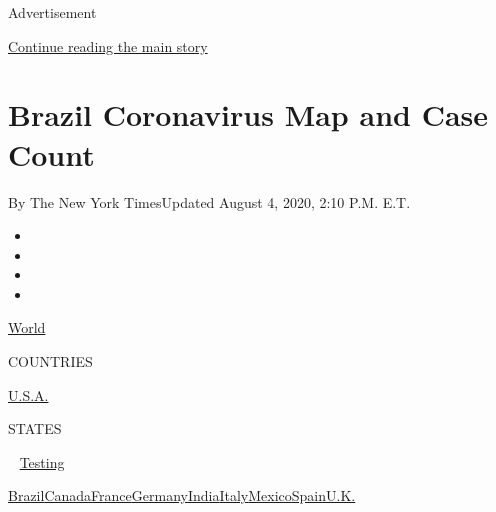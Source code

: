 Advertisement

\protect\hyperlink{after-top}{Continue reading the main story}

\hypertarget{brazil-coronavirus-map-and-case-count}{%
\section{Brazil Coronavirus Map and Case
Count}\label{brazil-coronavirus-map-and-case-count}}

By The New York TimesUpdated August 4, 2020, 2:10 P.M. E.T.

\begin{itemize}
\item
\item
\item
\item
\end{itemize}

\href{https://www.nytimes3xbfgragh.onion/interactive/2020/world/coronavirus-maps.html}{World}~

COUNTRIES

\textbar{}
\href{https://www.nytimes3xbfgragh.onion/interactive/2020/us/coronavirus-us-cases.html}{U.S.A.}~

STATES

~
\href{https://www.nytimes3xbfgragh.onion/interactive/2020/us/coronavirus-testing.html}{Testing}

\href{https://www.nytimes3xbfgragh.onion/interactive/2020/world/americas/brazil-coronavirus-cases.html}{Brazil}\href{https://www.nytimes3xbfgragh.onion/interactive/2020/world/canada/canada-coronavirus-cases.html}{Canada}\href{https://www.nytimes3xbfgragh.onion/interactive/2020/world/europe/france-coronavirus-cases.html}{France}\href{https://www.nytimes3xbfgragh.onion/interactive/2020/world/europe/germany-coronavirus-cases.html}{Germany}\href{https://www.nytimes3xbfgragh.onion/interactive/2020/world/asia/india-coronavirus-cases.html}{India}\href{https://www.nytimes3xbfgragh.onion/interactive/2020/world/europe/italy-coronavirus-cases.html}{Italy}\href{https://www.nytimes3xbfgragh.onion/interactive/2020/world/americas/mexico-coronavirus-cases.html}{Mexico}\href{https://www.nytimes3xbfgragh.onion/interactive/2020/world/europe/spain-coronavirus-cases.html}{Spain}\href{https://www.nytimes3xbfgragh.onion/interactive/2020/world/europe/united-kingdom-coronavirus-cases.html}{U.K.}

